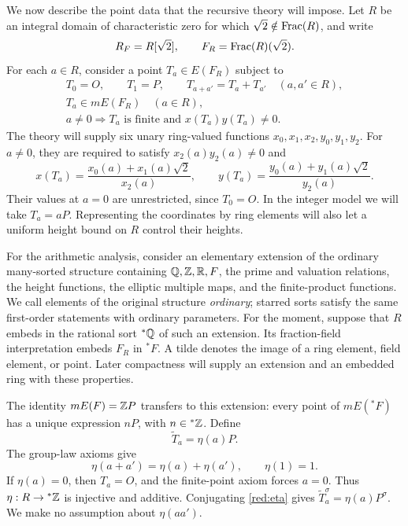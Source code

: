 We now describe the point data that the recursive theory will impose.
Let \(R\) be an integral domain
of characteristic zero for which \(\sqrt2\notin\operatorname{Frac}(R)\), and write
\[
 R_F=R[\sqrt2],\qquad F_R=\operatorname{Frac}(R)(\sqrt2).
\]
For each \(a\in R\), consider a point \(T_a\in E(F_R)\) subject to
\begin{equation}\label{red:elliptic-axioms}
\begin{gathered}
 T_0=O,\qquad T_1=P,\qquad
 T_{a+a'}=T_a+T_{a'}\quad(a,a'\in R),\\
 T_a\in mE(F_R)\quad(a\in R),\\
 a\ne0\Longrightarrow T_a\text{ is finite and }x(T_a)y(T_a)\ne0.
\end{gathered}
\end{equation}
The theory will supply six unary ring-valued functions
\(x_0,x_1,x_2,y_0,y_1,y_2\). For \(a\ne0\), they are required to
satisfy \(x_2(a)y_2(a)\ne0\) and
\begin{equation}\label{red:coordinate-functions}
 x(T_a)=\frac{x_0(a)+x_1(a)\sqrt2}{x_2(a)},\qquad
 y(T_a)=\frac{y_0(a)+y_1(a)\sqrt2}{y_2(a)}.
\end{equation}
Their values at \(a=0\) are unrestricted, since \(T_0=O\).
In the integer model we will take \(T_a=aP\). Representing the
coordinates by ring elements will also let a uniform height bound on
\(R\) control their heights.

For the arithmetic analysis, consider an elementary extension of the
ordinary many-sorted structure containing \(\mathbb Q,\mathbb Z,\mathbb R,F\), the prime and
valuation relations, the height functions, the elliptic multiple maps,
and the finite-product functions. We call elements of the original
structure \emph{ordinary}; starred sorts satisfy the same first-order
statements with ordinary parameters. For the moment, suppose that \(R\)
embeds in the rational sort \({}^*\mathbb Q\) of such an extension. Its
fraction-field interpretation embeds \(F_R\) in \({}^*F\). A tilde
denotes the image of a ring element, field element, or point. Later
compactness will supply an extension and an embedded ring with these
properties.

The identity \(mE(F)=\mathbb Z P\) transfers to this extension: every point
of \(mE({}^*F)\) has a unique expression \(nP\), with
\(n\in{}^*\mathbb Z\). Define
\begin{equation}\label{red:eta}
                         \widetilde T_a=\eta(a)P.
\end{equation}
The group-law axioms give
\begin{equation}\label{red:additivity}
       \eta(a+a')=\eta(a)+\eta(a'),\qquad \eta(1)=1.
\end{equation}
If \(\eta(a)=0\), then \(T_a=O\), and the finite-point axiom forces
\(a=0\). Thus \(\eta:R\to{}^*\mathbb Z\) is injective and additive.
Conjugating \eqref{red:eta} gives
\(\widetilde T_a^\sigma=\eta(a)P^\sigma\).
We make no assumption about \(\eta(aa')\).

